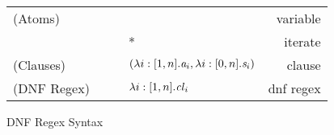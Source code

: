 \begin{figure}
\begin{tabular}{l@{\ }l@{\ }c@{\ }l@{\ }r}

(Atoms)& \Atom{} & \GEq{} & \RegexVariable{} & variable\\
& & &\GBar{} \DNFRegex{}* & iterate \\
(Clauses)& \Clause{} & \GEq{} &
$(\lambda i:[1,n].\mathit{a}_i,\lambda i:[0,n].\mathit{s}_i)$ & clause\\
(DNF Regex)& \DNFRegex{} & \GEq{} & $\lambda i:[1,n].\mathit{cl}_i$ & dnf regex\\
\end{tabular}
\caption{DNF Regex Syntax}
\label{fig:dnf-regex-definition}
\end{figure}

